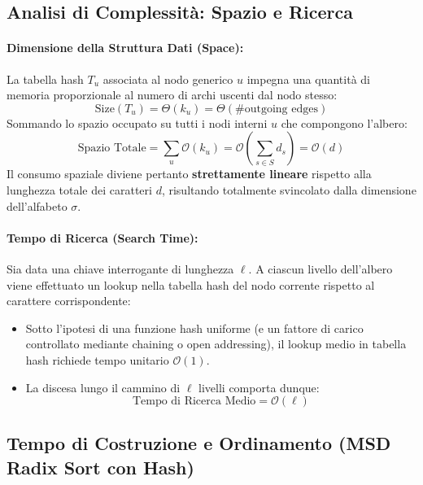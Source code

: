 \FloatBarrier
\subsection{Analisi di Complessità: Spazio e Ricerca}
\label{subsec:complessita-spazio-ricerca-hash}

\paragraph{Dimensione della Struttura Dati (Space):}
La tabella hash $T_u$ associata al nodo generico $u$ impegna una quantit\`a di memoria proporzionale al numero di archi uscenti dal nodo stesso:
\begin{equation}
  \text{Size}(T_u) = \Theta(k_u) = \Theta(\#\text{outgoing edges})
\end{equation}
Sommando lo spazio occupato su tutti i nodi interni $u$ che compongono l'albero:
\begin{equation}
  \text{Spazio Totale} = \sum_{u} \mathcal{O}(k_u) = \mathcal{O}\left( \sum_{s \in S} d_s \right) = \mathcal{O}(d)
\end{equation}
Il consumo spaziale diviene pertanto \textbf{strettamente lineare} rispetto alla lunghezza totale dei caratteri $d$, risultando totalmente svincolato dalla dimensione dell'alfabeto $\sigma$.

\paragraph{Tempo di Ricerca (Search Time):}
Sia data una chiave interrogante di lunghezza $\ell$. A ciascun livello dell'albero viene effettuato un lookup nella tabella hash del nodo corrente rispetto al carattere corrispondente:
\begin{itemize}
  \item Sotto l'ipotesi di una funzione hash uniforme (e un fattore di carico controllato mediante chaining o open addressing), il lookup medio in tabella hash richiede tempo unitario $\mathcal{O}(1)$.
  \item La discesa lungo il cammino di $\ell$ livelli comporta dunque:
  \begin{equation}
    \text{Tempo di Ricerca Medio} = \mathcal{O}(\ell)
  \end{equation}
\end{itemize}

\FloatBarrier
\subsection{Tempo di Costruzione e Ordinamento (MSD Radix Sort con Hash)}
\label{subsec:ordinamento-hash-trie}

